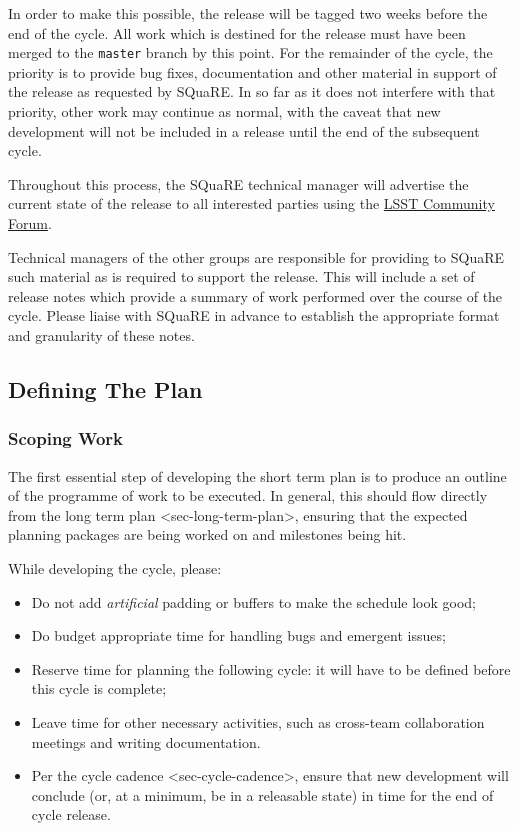 In order to make this possible, the release will be tagged two weeks
before the end of the cycle. All work which is destined for the release
must have been merged to the \texttt{master} branch by this point. For
the remainder of the cycle, the priority is to provide bug fixes,
documentation and other material in support of the release as requested
by SQuaRE. In so far as it does not interfere with that priority, other
work may continue as normal, with the caveat that new development will
not be included in a release until the end of the subsequent cycle.

Throughout this process, the SQuaRE technical manager will advertise the
current state of the release to all interested parties using the
\href{https://community.lsst.org/}{LSST Community Forum}.

Technical managers of the other groups are responsible for providing to
SQuaRE such material as is required to support the release. This will
include a set of release notes which provide a summary of work performed
over the course of the cycle. Please liaise with SQuaRE in advance to
establish the appropriate format and granularity of these notes.

\subsection{Defining The Plan}\label{defining-the-plan}

\subsubsection{Scoping Work}\label{scoping-work}

The first essential step of developing the short term plan is to produce
an outline of the programme of work to be executed. In general, this
should flow directly from the
long term plan \textless{}sec-long-term-plan\textgreater{}, ensuring
that the expected planning packages are being worked on and milestones
being hit.

While developing the cycle, please:

\begin{itemize}
\item
  Do not add \emph{artificial} padding or buffers to make the schedule
  look good;
\item
  Do budget appropriate time for handling bugs and emergent issues;
\item
  Reserve time for planning the following cycle: it will have to be
  defined before this cycle is complete;
\item
  Leave time for other necessary activities, such as cross-team
  collaboration meetings and writing documentation.
\item
  Per the cycle cadence \textless{}sec-cycle-cadence\textgreater{},
  ensure that new development will conclude (or, at a minimum, be in a
  releasable state) in time for the end of cycle release.
\end{itemize}

